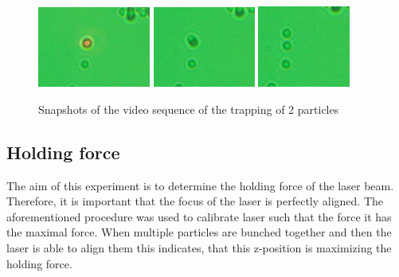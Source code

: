 \documentclass[12pt,english]{scrartcl}
\begin{document}
\begin{figure}[H]
	\centering
	\includegraphics[width=0.33\textwidth]{figures/stacked_1.JPG}
	\includegraphics[width=0.3\textwidth]{figures/stacked_2.JPG}
	\includegraphics[width=0.27\textwidth]{figures/stacked_3.JPG}
	\caption[Snapshots of the video sequence of the trapping of 2 particles]{Snapshots of
		the video sequence of the trapping of 2 particles
	}\label{fig:stacked}
\end{figure}

\subsection{Holding force}

The aim of this experiment is to determine the holding force of the laser beam.
Therefore, it is important that the focus of the laser is perfectly aligned.
The aforementioned procedure was used to calibrate laser such that the force it
has the maximal force. When multiple particles are bunched together and then
the laser is able to align them this indicates, that this z-position is
maximizing the holding force.
\end{document}
